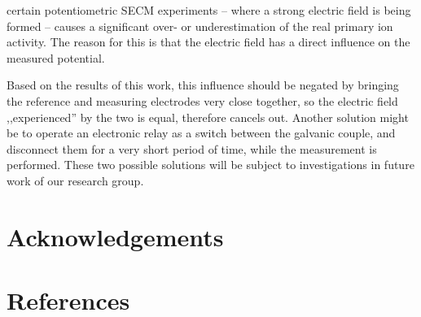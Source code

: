 \documentclass[3p]{elsarticle}
\begin{document}
 certain potentiometric SECM experiments -- where a strong electric field is being formed -- causes a significant over- or underestimation of the real primary ion activity. The reason for this is that the electric field has a direct influence on the measured potential.

Based on the results of this work, this influence should be negated by bringing the reference and measuring electrodes very close together, so the electric field ,,experienced'' by the two is equal, therefore cancels out. Another solution might be to operate an electronic relay as a switch between the galvanic couple, and disconnect them for a very short period of time, while the measurement is performed. These two possible solutions will be subject to investigations in future work of our research group.


\section*{Acknowledgements}

\section*{References}
\end{document}

